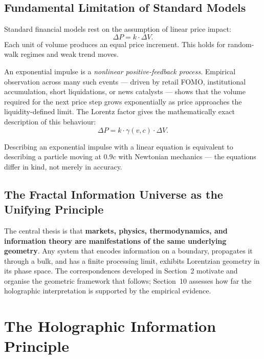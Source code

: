\documentclass[12pt,a4paper]{article}
\begin{document}
\subsection{Fundamental Limitation of Standard Models}

Standard financial models rest on the assumption of linear price impact:
\begin{equation}
    \Delta P = k \cdot \Delta V.
\end{equation}
Each unit of volume produces an equal price increment. This holds for
random-walk regimes and weak trend moves.

An exponential impulse is a \emph{nonlinear positive-feedback process}.
Empirical observation across many such events --- driven by retail FOMO,
institutional accumulation, short liquidations, or news catalysts ---
shows that the volume required for the next price step grows exponentially
as price approaches the liquidity-defined limit. The Lorentz factor
gives the mathematically exact description of this behaviour:
\begin{equation}
    \Delta P = k \cdot \gamma(v, c) \cdot \Delta V.
\end{equation}

Describing an exponential impulse with a linear equation is equivalent to
describing a particle moving at $0.9c$ with Newtonian mechanics --- the
equations differ in kind, not merely in accuracy.

\subsection{The Fractal Information Universe as the Unifying Principle}

The central thesis is that \textbf{markets, physics, thermodynamics, and
information theory are manifestations of the same underlying geometry}.
Any system that encodes information on a boundary, propagates it through
a bulk, and has a finite processing limit, exhibits Lorentzian geometry in
its phase space. The correspondences developed in Section~2 motivate and
organise the geometric framework that follows; Section~10 assesses how
far the holographic interpretation is supported by the empirical evidence.


\section{The Holographic Information Principle}
\end{document}
